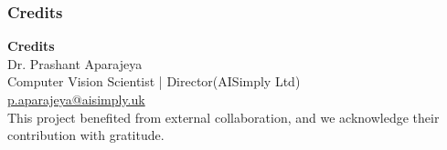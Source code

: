 \begin{frame}[plain]
  \frametitle{Credits}
  \begin{center}
    \textbf{Credits} \\[1.5em]

    \Large Dr. Prashant Aparajeya \\[0.5em]
    {\normalsize Computer Vision Scientist | Director(AISimply Ltd)} \\[0.5em]
    \footnotesize \href{mailto:p.aparajeya@aisimply.uk}{p.aparajeya@aisimply.uk} \\[2em]

    {\footnotesize This project benefited from external collaboration, and we acknowledge their contribution with gratitude.}
  \end{center}
\end{frame}
